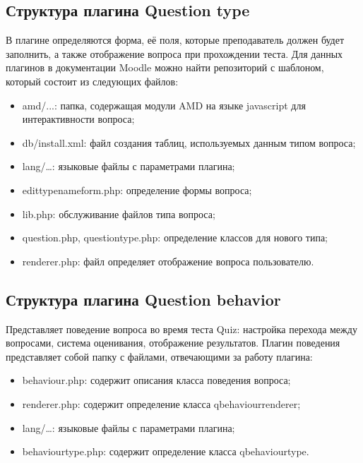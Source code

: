 \subsection{Структура плагина Question type} %
В плагине определяются форма, её поля, которые преподаватель должен будет заполнить, а также отображение вопроса при прохождении теста.
Для данных плагинов в документации Moodle можно найти репозиторий\cite{question-type-template} с шаблоном, который состоит из следующих файлов:
\begin{itemize}
	\item amd/...: папка, содержащая модули AMD на языке javascript для интерактивности вопроса;
	\item db/install.xml: файл создания таблиц, используемых данным типом вопроса;
	\item lang/…: языковые файлы с параметрами плагина;
	\item edit\textunderscore typename\textunderscore form.php: определение формы вопроса;
	\item lib.php: обслуживание файлов типа вопроса;
	\item question.php, questiontype.php: определение классов для нового типа;
	\item renderer.php: файл определяет отображение вопроса пользователю.
\end{itemize}

\subsection{Структура плагина Question behavior} %
Представляет поведение вопроса во время теста Quiz: настройка перехода между вопросами, система оценивания, отображение результатов. Плагин поведения представляет собой папку с файлами, отвечающими за работу плагина:
\begin{itemize}
	\item behaviour.php: содержит описания класса поведения вопроса;
	\item renderer.php: содержит определение класса qbehaviour\textunderscore renderer;
	\item lang/…: языковые файлы с параметрами плагина;
	\item behaviourtype.php: содержит определение класса qbehaviour\textunderscore type.\cite{question-behavior}
\end{itemize}



